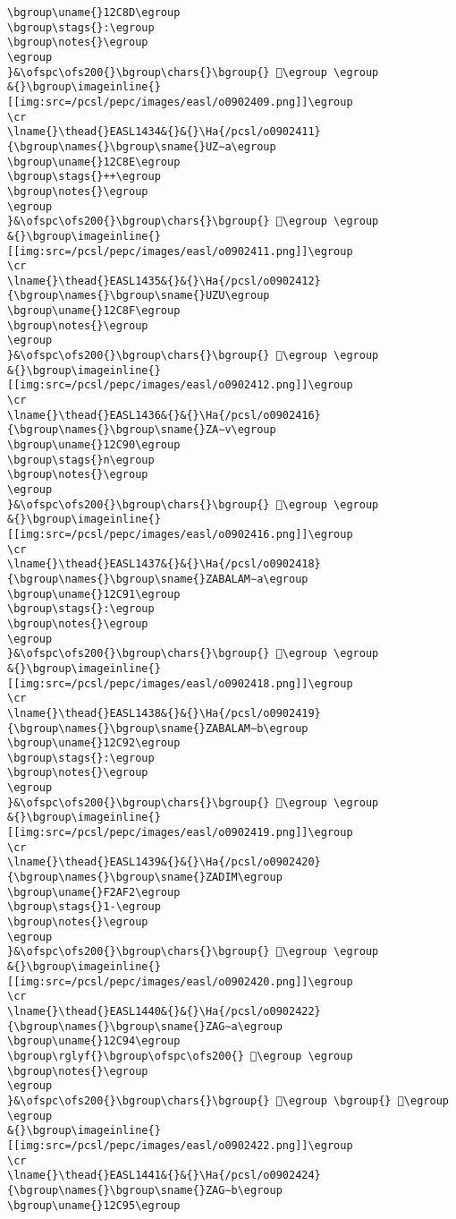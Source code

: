 \begin{verbatim}
\bgroup\uname{}12C8D\egroup
\bgroup\stags{}:\egroup
\bgroup\notes{}\egroup
\egroup
}&\ofspc\ofs200{}\bgroup\chars{}\bgroup{} 𒲍\egroup \egroup
&{}\bgroup\imageinline{}[[img:src=/pcsl/pepc/images/easl/o0902409.png]]\egroup
\cr
\lname{}\thead{}EASL1434&{}&{}\Ha{/pcsl/o0902411}{\bgroup\names{}\bgroup\sname{}UZ∼a\egroup
\bgroup\uname{}12C8E\egroup
\bgroup\stags{}++\egroup
\bgroup\notes{}\egroup
\egroup
}&\ofspc\ofs200{}\bgroup\chars{}\bgroup{} 𒲎\egroup \egroup
&{}\bgroup\imageinline{}[[img:src=/pcsl/pepc/images/easl/o0902411.png]]\egroup
\cr
\lname{}\thead{}EASL1435&{}&{}\Ha{/pcsl/o0902412}{\bgroup\names{}\bgroup\sname{}UZU\egroup
\bgroup\uname{}12C8F\egroup
\bgroup\notes{}\egroup
\egroup
}&\ofspc\ofs200{}\bgroup\chars{}\bgroup{} 𒲏\egroup \egroup
&{}\bgroup\imageinline{}[[img:src=/pcsl/pepc/images/easl/o0902412.png]]\egroup
\cr
\lname{}\thead{}EASL1436&{}&{}\Ha{/pcsl/o0902416}{\bgroup\names{}\bgroup\sname{}ZA∼v\egroup
\bgroup\uname{}12C90\egroup
\bgroup\stags{}n\egroup
\bgroup\notes{}\egroup
\egroup
}&\ofspc\ofs200{}\bgroup\chars{}\bgroup{} 𒲐\egroup \egroup
&{}\bgroup\imageinline{}[[img:src=/pcsl/pepc/images/easl/o0902416.png]]\egroup
\cr
\lname{}\thead{}EASL1437&{}&{}\Ha{/pcsl/o0902418}{\bgroup\names{}\bgroup\sname{}ZABALAM∼a\egroup
\bgroup\uname{}12C91\egroup
\bgroup\stags{}:\egroup
\bgroup\notes{}\egroup
\egroup
}&\ofspc\ofs200{}\bgroup\chars{}\bgroup{} 𒲑\egroup \egroup
&{}\bgroup\imageinline{}[[img:src=/pcsl/pepc/images/easl/o0902418.png]]\egroup
\cr
\lname{}\thead{}EASL1438&{}&{}\Ha{/pcsl/o0902419}{\bgroup\names{}\bgroup\sname{}ZABALAM∼b\egroup
\bgroup\uname{}12C92\egroup
\bgroup\stags{}:\egroup
\bgroup\notes{}\egroup
\egroup
}&\ofspc\ofs200{}\bgroup\chars{}\bgroup{} 𒲒\egroup \egroup
&{}\bgroup\imageinline{}[[img:src=/pcsl/pepc/images/easl/o0902419.png]]\egroup
\cr
\lname{}\thead{}EASL1439&{}&{}\Ha{/pcsl/o0902420}{\bgroup\names{}\bgroup\sname{}ZADIM\egroup
\bgroup\uname{}F2AF2\egroup
\bgroup\stags{}1-\egroup
\bgroup\notes{}\egroup
\egroup
}&\ofspc\ofs200{}\bgroup\chars{}\bgroup{} 󲫲\egroup \egroup
&{}\bgroup\imageinline{}[[img:src=/pcsl/pepc/images/easl/o0902420.png]]\egroup
\cr
\lname{}\thead{}EASL1440&{}&{}\Ha{/pcsl/o0902422}{\bgroup\names{}\bgroup\sname{}ZAG∼a\egroup
\bgroup\uname{}12C94\egroup
\bgroup\rglyf{}\bgroup\ofspc\ofs200{} 𒲔\egroup \egroup
\bgroup\notes{}\egroup
\egroup
}&\ofspc\ofs200{}\bgroup\chars{}\bgroup{} 𒲓\egroup \bgroup{} 𒲔\egroup \egroup
&{}\bgroup\imageinline{}[[img:src=/pcsl/pepc/images/easl/o0902422.png]]\egroup
\cr
\lname{}\thead{}EASL1441&{}&{}\Ha{/pcsl/o0902424}{\bgroup\names{}\bgroup\sname{}ZAG∼b\egroup
\bgroup\uname{}12C95\egroup

\end{verbatim}

